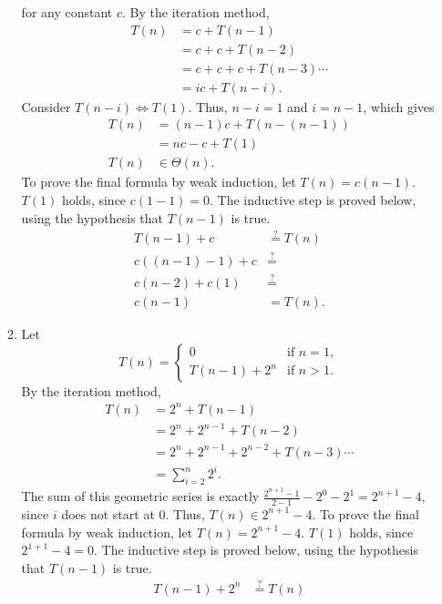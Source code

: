 \documentclass[12pt]{article}
\begin{document}
\begin{enumerate}
\begin{enumerate}
\[    \] for any constant $c$. By the iteration method,
    \begin{align*}
      T(n) &= c + T(n - 1) \\
      &= c + c + T(n - 2) \\
      &= c + c + c + T(n - 3) \cdots \\
      &= ic + T(n - i).
    \end{align*}
    Consider $T(n - i) \Leftrightarrow T(1)$. Thus, $n - i = 1$ and $i = n - 1$, which gives
    \begin{align*}
      T(n) &= (n - 1)c + T(n - (n - 1)) \\
      &= nc - c + T(1) \\
      T(n) &\in \Theta(n).
    \end{align*}
    To prove the final formula by weak induction, let $T(n) = c(n - 1)$. $T(1)$ holds, since $c(1 - 1) = 0$. The inductive step is proved below, using the hypothesis that $T(n - 1)$ is true.
    \begin{align*}
      T(n - 1) + c &\stackrel{?}{=} T(n) \\
      c((n - 1) - 1) + c &\stackrel{?}{=} \\
      c(n - 2) + c(1) &\stackrel{?}{=} \\
      c(n - 1) &= T(n).
    \end{align*}
    \item Let \[
      T(n) = \begin{cases}
        0 &\text{if } n = 1, \\
        T(n - 1) + 2^{n} &\text{if } n > 1.
      \end{cases}
    \] By the iteration method,
    \begin{align*}
      T(n) &= 2^{n} + T(n - 1) \\
      &= 2^{n} + 2^{n - 1} + T(n - 2) \\
      &= 2^{n} + 2^{n - 1} + 2^{n - 2} + T(n - 3) \cdots \\
      &= \sum_{i = 2}^{n} 2^{i}.
    \end{align*}
    The sum of this geometric series is exactly $\frac{2^{n + 1} - 1}{2 - 1} - 2^{0} - 2^{1} = 2^{n + 1} - 4$, since $i$ does not start at $0$. Thus, $T(n) \in 2^{n + 1} - 4$. To prove the final formula by weak induction, let $T(n) = 2^{n + 1} - 4$. $T(1)$ holds, since $2^{1 + 1} - 4 = 0$. The inductive step is proved below, using the hypothesis that $T(n - 1)$ is true.
    \begin{align*}
      T(n - 1) + 2^{n} &\stackrel{?}{=} T(n) \\

\end{align*}
\end{enumerate}
\end{enumerate}
\end{document}

